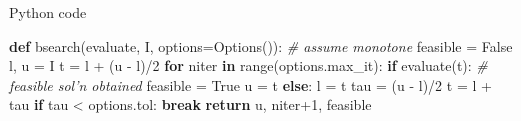 \documentclass[10pt,ignorenonframetext,serif,onlymath]{beamer}
\newenvironment{Shaded}{}{}
\newcommand{\BuiltInTok}[1]{#1}
\newcommand{\CommentTok}[1]{\textcolor[rgb]{0.38,0.63,0.69}{\textit{#1}}}
\newcommand{\ControlFlowTok}[1]{\textcolor[rgb]{0.00,0.44,0.13}{\textbf{#1}}}
\newcommand{\DecValTok}[1]{\textcolor[rgb]{0.25,0.63,0.44}{#1}}
\newcommand{\KeywordTok}[1]{\textcolor[rgb]{0.00,0.44,0.13}{\textbf{#1}}}
\newcommand{\NormalTok}[1]{#1}
\newcommand{\OperatorTok}[1]{\textcolor[rgb]{0.40,0.40,0.40}{#1}}
\newcommand{\VariableTok}[1]{\textcolor[rgb]{0.10,0.09,0.49}{#1}}
\begin{document}
\begin{frame}[fragile]{Python code}
\protect\hypertarget{sec:python-code-1}{}

\begin{Shaded}
\begin{Highlighting}[]
\KeywordTok{def}\NormalTok{ bsearch(evaluate, I, options}\OperatorTok{=}\NormalTok{Options()):}
    \CommentTok{# assume monotone}
\NormalTok{    feasible }\OperatorTok{=} \VariableTok{False}
\NormalTok{    l, u }\OperatorTok{=}\NormalTok{ I}
\NormalTok{    t }\OperatorTok{=}\NormalTok{ l }\OperatorTok{+}\NormalTok{ (u }\OperatorTok{-}\NormalTok{ l)}\OperatorTok{/}\DecValTok{2}
    \ControlFlowTok{for}\NormalTok{ niter }\KeywordTok{in} \BuiltInTok{range}\NormalTok{(options.max_it):}
        \ControlFlowTok{if}\NormalTok{ evaluate(t):  }\CommentTok{# feasible sol'n obtained}
\NormalTok{            feasible }\OperatorTok{=} \VariableTok{True}
\NormalTok{            u }\OperatorTok{=}\NormalTok{ t}
        \ControlFlowTok{else}\NormalTok{:}
\NormalTok{            l }\OperatorTok{=}\NormalTok{ t}
\NormalTok{        tau }\OperatorTok{=}\NormalTok{ (u }\OperatorTok{-}\NormalTok{ l)}\OperatorTok{/}\DecValTok{2}
\NormalTok{        t }\OperatorTok{=}\NormalTok{ l }\OperatorTok{+}\NormalTok{ tau}
        \ControlFlowTok{if}\NormalTok{ tau }\OperatorTok{<}\NormalTok{ options.tol:}
            \ControlFlowTok{break}
    \ControlFlowTok{return}\NormalTok{ u, niter}\OperatorTok{+}\DecValTok{1}\NormalTok{, feasible}
\end{Highlighting}
\end{Shaded}

\end{frame}
\end{document}

